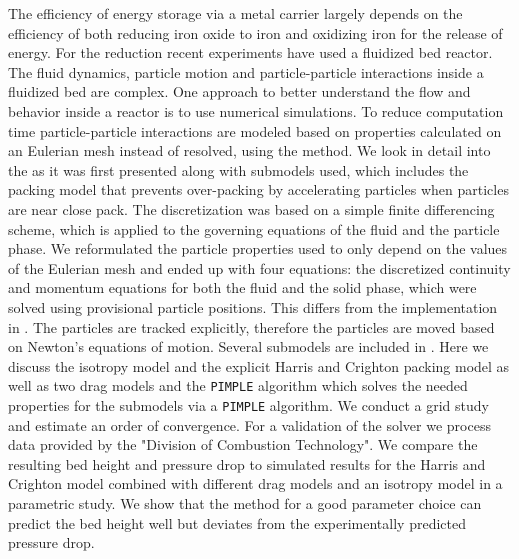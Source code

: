 
\Abstract
The efficiency of energy storage via a metal carrier largely depends on the efficiency of both reducing iron oxide to iron and oxidizing iron for the release of energy.
For the reduction recent experiments have used a fluidized bed reactor. 
The fluid dynamics, particle motion and particle-particle interactions inside a fluidized bed are complex.
One approach to better understand the flow and behavior inside a reactor is to use numerical simulations.
To reduce computation time particle-particle interactions are modeled based on properties calculated on an Eulerian mesh instead of resolved, using the \MP method. 
We look in detail into the \MP as it was first presented along with submodels used, which includes the packing model that prevents over-packing by accelerating particles when particles are near close pack.
The discretization was based on a simple finite differencing scheme, which is applied to the governing equations of the fluid and the particle phase.
We reformulated the particle properties used to only depend on the values of the Eulerian mesh and ended up with four equations: the discretized continuity and momentum equations for both the fluid and the solid phase, which were solved using provisional particle positions.
This differs from the implementation in \OF.
The particles are tracked explicitly, therefore the particles are moved based on Newton's equations of motion.
Several submodels are included in \OF. Here we discuss the isotropy model and the explicit Harris and Crighton packing model as well as two drag models and the \lstinline|PIMPLE| algorithm which solves the needed properties for the submodels via a \lstinline|PIMPLE| algorithm.
We conduct a grid study and estimate an order of convergence.
For a validation of the solver we process data provided by the "Division of Combustion Technology".
We compare the resulting bed height and pressure drop to simulated results for the Harris and Crighton model combined with different drag models and an isotropy model in a parametric study.
We show that the \MP method for a good parameter choice can predict the bed height well but deviates from the experimentally predicted pressure drop.